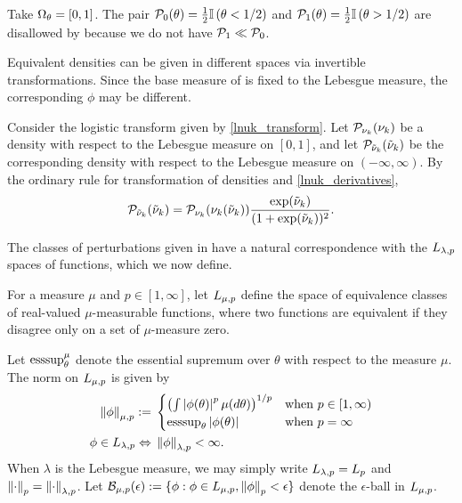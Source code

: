 \begin{ex}
%
Take $\Omega_{\theta} = [0,1]$.  The pair $\mathcal{P}_{0}(\theta)  = \frac{1}{2}\mathbb{I}\left(\theta < 1/2\right)$
and $\mathcal{P}_{1}(\theta) = \frac{1}{2} \mathbb{I}\left(\theta > 1/2\right)$ are disallowed
by  because we do not have $\mathcal{P}_{1} \ll \mathcal{P}_{0}$.
%
\end{ex}


\begin{ex}
%
Equivalent densities can be given in different spaces via invertible
transformations.  Since the base measure of 
is fixed to the Lebesgue measure, the corresponding $\phi$ may be different.

Consider the logistic transform given by \eqref{lnuk_transform}. Let
$\mathcal{P}_{\nu_{k}}(\nu_{k})$ be a density with respect to the Lebesgue measure on $[0,1]$,
and let $\mathcal{P}_{\tilde{\nu}_{k}}(\tilde{\nu}_{k})$ be the corresponding density with respect to the
Lebesgue measure on $(-\infty, \infty)$.  By the ordinary rule for
transformation of densities and \eqref{lnuk_derivatives},
%
\begin{align*}
%
\p_{\lnuk}(\lnuk) = \p_{\nuk}(\nuk(\lnuk)) \frac{\exp(\lnuk)}{(1 +
\exp(\lnuk))^2}.
%
\end{align*}
%
\end{ex}

The classes of perturbations given in  have a natural
correspondence with the ${L_{\lambda, p}}$ spaces of functions, which we now
define.


\begin{defn}
\citep[Sections 5.1-5.2]{dudley:2018:real}
%
For a measure $\mu$ and $p \in [1, \infty]$, let ${L_{\mu,p}}$ define the
space of equivalence classes of real-valued $\mu$-measurable functions,
where two functions are equivalent if they disagree only on a set of
$\mu$-measure zero.

Let $\operatorname*{\mathrm{esssup}}_\theta^\mu$ denote the essential supremum over $\theta$ with
respect to the measure $\mu$. The norm on ${L_{\mu,p}}$ is given by
%
\begin{align*}
%
\norm{\phi}_{\mu,p} :={}&
\begin{cases}
    \left(\int \abs{\phi(\theta)}^p \mu(d\theta)\right)^{1/p}
    & \textrm{when }p \in [1, \infty)\\
    \esssup_{\theta} \abs{\phi(\theta)}
    & \textrm{when }p = \infty
\end{cases}\\
%
\phi \in \lp{\lambda,p} \Leftrightarrow{}& \norm{\phi}_{\lambda,p} < \infty.
%
\end{align*}
%
When $\lambda$ is the  Lebesgue measure, we may simply write ${L_{\lambda,p}} =
{L_{p}}$ and $\left\Vert\cdot\right\Vert_{p} = \left\Vert\cdot\right\Vert_{\lambda,p}$.
%
Let $\mathcal{B}_{\mu,p}(\epsilon) := \{\phi: \phi \in {L_{\mu, p}},
\left\Vert\phi\right\Vert_p < \epsilon \}$ denote the $\epsilon$-ball in ${L_{\mu, p}}$.
%
\end{defn}

